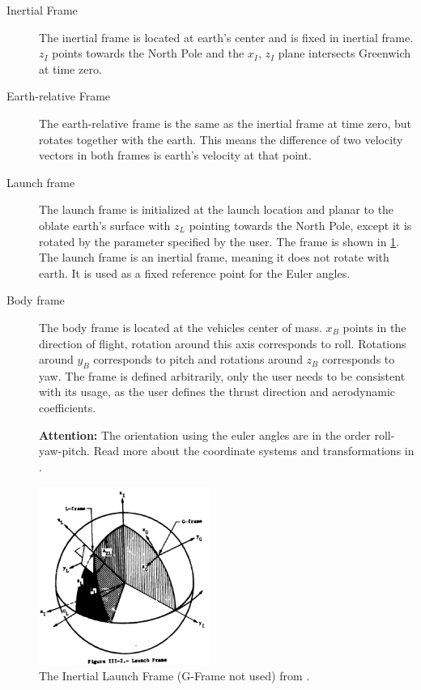 \begin{description}
  \item[Inertial Frame] The inertial frame is located at earth's center and is
    fixed in inertial frame. \(z_I\) points towards the North Pole and the \(x_I\), \(z_I\)
    plane intersects Greenwich at time zero.
  \item[Earth-relative Frame] The earth-relative frame is the same as the
    inertial frame at time zero, but rotates together with the earth. This means
    the difference of two velocity vectors in both frames is earth's velocity at
    that point.
  \item[Launch frame] The launch frame is initialized at the launch location and
    planar to the oblate earth's surface with \(z_L\) pointing towards the North Pole,
    except it is rotated by the  parameter specified by the user. The frame is shown in \cref{launch-frame}. The launch frame is an inertial frame, meaning it does not
    rotate with earth. It is used as a fixed reference point for the Euler angles.
  \item[Body frame] The body frame is located at the vehicles center of mass. \(x_B\)
    points in the direction of flight, rotation around this axis corresponds to roll.
    Rotations around \(y_B\) corresponds to pitch and rotations around \(z_B\) corresponds
    to yaw. The frame is defined arbitrarily, only the user needs to be consistent with its
    usage, as the user defines the thrust direction and aerodynamic coefficients.

    \textbf{Attention:} The orientation using the euler angles are in the order
    roll-yaw-pitch. Read more about the coordinate systems and transformations in \cite[Sec. III]{PostFormulation}.
\end{description}

\begin{figure}[!ht]
  \centering
  \includegraphics[width=0.5\textwidth]{images/launch-frame.png}
  \caption{The Inertial Launch Frame (G-Frame not used) from \cite[Fig. III-2]{PostFormulation}.}
  \label{launch-frame}
\end{figure}

